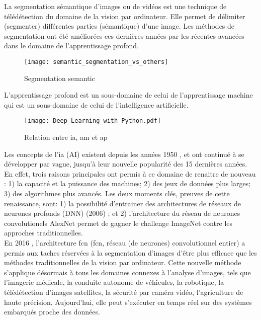 ﻿\noindent La segmentation sémantique d'images ou de vidéos est une technique de télédétection du domaine de la vision par ordinateur. Elle permet de délimiter (segmenter) différentes parties (sémantique) d'une image. Les méthodes de segmentation ont été améliorées ces dernières années par les récentes avancées dans le domaine de l'apprentissage profond. 
\begin{figure}[H]
   \centering
   \texttt{[image: semantic\_segmentation\_vs\_others]}
   \caption[Segmentation semantic]{Segmentation semantic\parencite[p.~1]{wu_recent_2019}}
   \label{fig:semantic_segmentation_vs_others}
\end{figure}
\noindent L’apprentissage profond est un sous-domaine de celui de l'apprentissage machine qui est un sous-domaine de celui de l'intelligence artificielle. 
\begin{figure}[H]
   \centering
   \texttt{[image: Deep\_Learning\_with\_Python.pdf]}
   \caption[Relation entre \acrlong{ia}, \acrlong{am} et \acrlong{ap}]{Relation entre \acrlong{ia}, \acrlong{am} et \acrlong{ap} \parencite[p.~4]{chollet_deep_2018}}
   \label{fig:ia_ml_ap}
\end{figure}
\noindent Les concepts de l'\lowercase{\acrlong{ia}} (AI) existent depuis les années 1950 \parencite[p.~4]{chollet_deep_2018} \parencite[p.~1]{alom_history_2018}, et ont continué à se développer par vague, jusqu'à leur nouvelle popularité des 15 dernières années. En effet, trois raisons principales ont permis à ce domaine de renaitre de nouveau \parencite[p.~20]{chollet_deep_2018}: 1) la capacité et la puissance des machines; 2) des jeux de données plus larges; 3) des algorithmes plus avancés. Les deux moments clés, preuves de cette renaissance, sont: 1) la possibilité d'entrainer des architectures de réseaux de neurones profonds (DNN) (2006) \parencite[p.~6]{alom_history_2018}; et 2) l'architecture du réseau de neurones convolutionels AlexNet permet de  gagner le challenge ImageNet contre les approches traditionnelles\parencite[p.~11]{alom_history_2018}. 
\vspace{\baselineskip}
\\
\noindent En 2016 \parencite[p.~14]{alom_history_2018}, l'architecture \acrshort{fcn} (\acrlong{fcn}, réseau (de neurones) convolutionnel entier) a permis aux taches réservées à la segmentation d'images d'être plus efficace que les méthodes traditionnelles de la vision par ordinateur. Cette nouvelle méthode s'applique désormais à tous les domaines connexes à l'analyse d'images, tels que l'imagerie médicale, la conduite autonome de véhicules, la robotique, la télédétection d'images satellites, la sécurité par caméra vidéo, l'agriculture de haute précision. Aujourd'hui, elle peut s'exécuter en temps réel sur des systèmes embarqués proche des données. 
